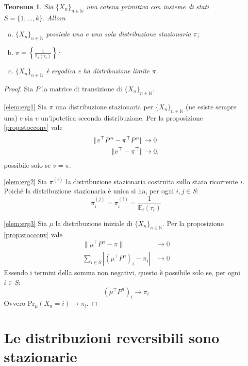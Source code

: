 \documentclass{article}
\theoremstyle{plain}
\newtheorem{thm}{Teorema}
\newcommand{\N}{\mathbb N}
\newcommand{\abs}[1]{\left|#1\right|}
\newcommand{\norm}[1]{\|#1\|}
\newcommand{\tra}{^\top}
\newcommand{\chain}[1]{\{#1_n\}_{n\in\N}}
\newcommand{\ev}{\mathbb E}
\newcommand{\ape}[1]{^{(#1)}}
\renewcommand{\Pr}{\mathrm{Pr}}
\begin{document}
\begin{thm}
	Sia $\chain{X}$ una catena primitiva con insieme di stati $S=\{1,\dots,k\}$. Allora
	\begin{enumerate}[(a)]
		\item \label{elem:erg1} $\chain{X}$ possiede una e una sola distribuzione stazionaria $\pi$;
		\item \label{elem:erg2} $\pi=\left\{ \frac{1}{\ev_i(\tau_i)} \right\}$;
		\item \label{elem:erg3} $\chain{X}$ è ergodica e ha distribuzione limite $\pi$.
	\end{enumerate}
\end{thm}
\begin{proof}
	Sia $P$ la matrice di transizione di $\chain{X}$.

	\ref{elem:erg1} Sia $\pi$ una distribuzione stazionaria per $\chain{X}$ (ne esiste sempre una) e sia $v$ un'ipotetica seconda distribuzione. Per la proposizione \ref{prop:stocconv} vale
	\begin{align*}
		\norm{v\tra P^n-\pi\tra P^n} & \to 0        \\
		\norm{v\tra-\pi\tra}         & \to 0 \text,
	\end{align*}
	possibile solo se $v=\pi$.

	\ref{elem:erg2} Sia $\pi^{(i)}$ la distribuzione stazionaria costruita sullo stato ricorrente $i$. Poiché la distribuzione stazionaria è unica si ha, per ogni $i,j\in S$:
	\begin{equation*}
		\pi\ape{j}_i = \pi\ape{i}_i = \frac{1}{\ev_i(\tau_i)}
	\end{equation*}

	\ref{elem:erg3} Sia $\mu$ la distribuzione iniziale di $\chain{X}$. Per la proposizione \ref{prop:stocconv} vale
	\begin{align*}
		\norm{\mu\tra P^n-\pi}                   & \to 0 \\
		\sum_{i\in S}\abs{(\mu\tra P^n)_i-\pi_i} & \to 0
	\end{align*}
	Essendo i termini della somma non negativi, questo è possibile solo se, per ogni $i\in S$:
	\begin{equation*}
		(\mu\tra P^n)_i \to \pi_i
	\end{equation*}
	Ovvero $\Pr_{\mu}(X_n=i)\to \pi_i$. \qedhere
\end{proof}



\section{Le distribuzioni reversibili sono stazionarie}
\end{document}
